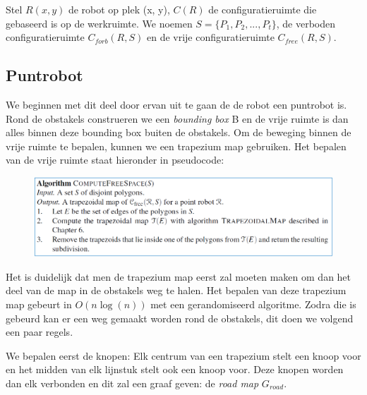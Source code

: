 \documentclass[12pt,a4paper]{article}
\begin{document}
	Stel $R(x, y)$ de robot op plek (x, y), $C(R)$ de configuratieruimte die gebaseerd is op de werkruimte. We noemen $S = \{P_1, P_2, ..., P_t\}$, de verboden configuratieruimte $C_{forb}(R, S)$ en de vrije configuratieruimte $C_{free}(R, S)$. 
	
	
	\subsection{Puntrobot}
	We beginnen met dit deel door ervan uit te gaan de de robot een puntrobot is. Rond de obstakels construeren we een \textit{bounding box} B en de vrije ruimte is dan alles binnen deze bounding box buiten de obstakels. Om de beweging binnen de vrije ruimte te bepalen, kunnen we een trapezium map gebruiken. Het bepalen van de vrije ruimte staat hieronder in pseudocode: 
	\begin{figure}[H]
		\centering
		\includegraphics[width=0.8\linewidth]{afbeeldingen/Motion-plannine/computeFreeSpave}
		\label{fig:computefreespave}
	\end{figure}
	Het is duidelijk dat men de trapezium map eerst zal moeten maken om dan het deel van de map in de obstakels weg te halen. Het bepalen van deze trapezium map gebeurt in $O(n\log(n))$ met een gerandomiseerd algoritme. Zodra die is gebeurd kan er een weg gemaakt worden rond de obstakels, dit doen we volgend een paar regels. 
	
	We bepalen eerst de knopen: Elk centrum van een trapezium stelt een knoop voor en het midden van elk lijnstuk stelt ook een knoop voor. Deze knopen worden dan elk verbonden en dit zal een graaf geven: de \textit{road map} $G_{road}$. 
	
\end{document}
